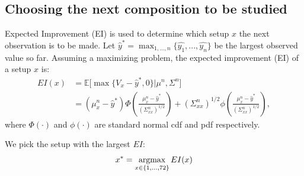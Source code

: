 \documentclass[11pt]{article}
\newcommand{\argmax}{\operatornamewithlimits{argmax}}
\begin{document}
\subsection{Choosing the next composition to be studied}\label{sec:sinEI}
Expected Improvement (EI) is used to determine which setup $x$ the next observation is to be made.
Let $\hat{y}^* = \max_{1,...,n}\{\hat{y_1},...,\hat{y_n}\}$ be the largest observed value so far. Assuming a maximizing problem, the expected improvement (EI) of a setup $x$ is:
\begin{align*}
EI(x) & = \mathbb{E}\Big[\max\{V_x - \hat{y}^*, 0\}\Big|\mu^n, \Sigma^n \Big] \\
& = (\mu_{x}^{n} - \hat{y}^*)\Phi\left(\frac{\mu_{x}^{n} - \hat{y}^*}{(\Sigma_{xx}^n)^{1/2}}\right) + (\Sigma_{xx}^n)^{1/2}\phi\left(\frac{\mu_{x}^{n} - \hat{y}^*}{(\Sigma_{xx}^n)^{1/2}}\right),
\end{align*}
where $\Phi(\cdot)$ and $\phi(\cdot)$ are standard normal cdf and pdf respectively.

We pick the setup with the largest $EI$:
\begin{equation}
x^* = \argmax_{x\in\{1,...,72\}}EI(x)
\end{equation}
\end{document}
